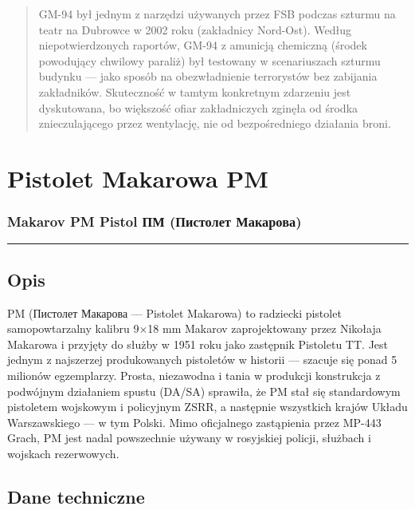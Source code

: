 \documentclass[12pt,openany,oneside]{book}
\begin{document}
\begin{quote}
GM-94 był jednym z narzędzi używanych przez FSB podczas szturmu na teatr
na Dubrowce w 2002 roku (zakładnicy Nord-Ost). Według niepotwierdzonych
raportów, GM-94 z amunicją chemiczną (środek powodujący chwilowy
paraliż) był testowany w scenariuszach szturmu budynku --- jako sposób
na obezwładnienie terrorystów bez zabijania zakładników. Skuteczność w
tamtym konkretnym zdarzeniu jest dyskutowana, bo większość ofiar
zakładniczych zginęła od środka znieczulającego przez wentylację, nie od
bezpośredniego działania broni.
\end{quote}

\chapter{Pistolet Makarowa PM}\label{pistolet-makarowa-pm}

\subsection{Makarov PM Pistol \textbar{} ПМ (Пистолет
Макарова)}\label{makarov-pm-pistol-ux43fux43c-ux43fux438ux441ux442ux43eux43bux435ux442-ux43cux430ux43aux430ux440ux43eux432ux430}

\begin{center}\rule{0.5\linewidth}{0.5pt}\end{center}

\section{Opis}\label{opis-86}

PM (Пистолет Макарова --- Pistolet Makarowa) to radziecki pistolet
samopowtarzalny kalibru 9×18 mm Makarov zaprojektowany przez Nikołaja
Makarowa i przyjęty do służby w 1951 roku jako zastępnik Pistoletu TT.
Jest jednym z najszerzej produkowanych pistoletów w historii --- szacuje
się ponad 5 milionów egzemplarzy. Prosta, niezawodna i tania w produkcji
konstrukcja z podwójnym działaniem spustu (DA/SA) sprawiła, że PM stał
się standardowym pistoletem wojskowym i policyjnym ZSRR, a następnie
wszystkich krajów Układu Warszawskiego --- w tym Polski. Mimo
oficjalnego zastąpienia przez MP-443 Grach, PM jest nadal powszechnie
używany w rosyjskiej policji, służbach i wojskach rezerwowych.

\section{Dane techniczne}\label{dane-techniczne-86}
\end{document}
